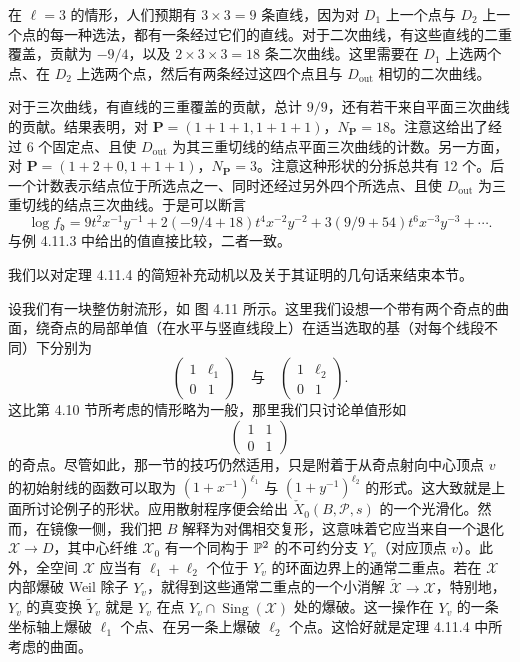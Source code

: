 在 $\ell=3$ 的情形，人们预期有 $3\times3=9$ 条直线，因为对 $D_1$ 上一个点与 $D_2$ 上一个点的每一种选法，都有一条经过它们的直线。对于二次曲线，有这些直线的二重覆盖，贡献为 $-9/4$，以及 $2\times3\times3=18$ 条二次曲线。这里需要在 $D_1$ 上选两个点、在 $D_2$ 上选两个点，然后有两条经过这四个点且与 $D_{\mathrm{out}}$ 相切的二次曲线。

对于三次曲线，有直线的三重覆盖的贡献，总计 $9/9$，还有若干来自平面三次曲线的贡献。结果表明，对 $\mathbf{P}=(1+1+1,1+1+1)$，$N_{\mathbf{P}}=18$。注意这给出了经过 6 个固定点、且使 $D_{\mathrm{out}}$ 为其三重切线的结点平面三次曲线的计数。另一方面，对 $\mathbf{P}=(1+2+0,1+1+1)$，$N_{\mathbf{P}}=3$。注意这种形状的分拆总共有 12 个。后一个计数表示结点位于所选点之一、同时还经过另外四个所选点、且使 $D_{\mathrm{out}}$ 为三重切线的结点三次曲线。于是可以断言
\[
\log f_\mathfrak{d}=9t^{2}x^{-1}y^{-1}+2(-9/4+18)t^{4}x^{-2}y^{-2}+3(9/9+54)t^{6}x^{-3}y^{-3}+\cdots.
\]
与例 4.11.3 中给出的值直接比较，二者一致。

我们以对定理 4.11.4 的简短补充动机以及关于其证明的几句话来结束本节。

设我们有一块整仿射流形，如 图 4.11 所示。这里我们设想一个带有两个奇点的曲面，绕奇点的局部单值（在水平与竖直线段上）在适当选取的基（对每个线段不同）下分别为
\[
\begin{pmatrix}1&\ell_1\\0&1\end{pmatrix}
\quad\text{与}\quad
\begin{pmatrix}1&\ell_2\\0&1\end{pmatrix}.
\]
这比第 4.10 节所考虑的情形略为一般，那里我们只讨论单值形如
\[
\begin{pmatrix}1&1\\0&1\end{pmatrix}
\]
的奇点。尽管如此，那一节的技巧仍然适用，只是附着于从奇点射向中心顶点 $v$ 的初始射线的函数可以取为 $(1+x^{-1})^{\ell_1}$ 与 $(1+y^{-1})^{\ell_2}$ 的形式。这大致就是上面所讨论例子的形状。应用散射程序便会给出 $\check X_0(B,\mathscr{P},s)$ 的一个光滑化。然而，在镜像一侧，我们把 $B$ 解释为对偶相交复形，这意味着它应当来自一个退化 $\mathcal{X}\to D$，其中心纤维 $\mathcal{X}_0$ 有一个同构于 $\mathbb{P}^2$ 的不可约分支 $Y_v$（对应顶点 $v$）。此外，全空间 $\mathcal{X}$ 应当有 $\ell_1+\ell_2$ 个位于 $Y_v$ 的环面边界上的通常二重点。若在 $\mathcal{X}$ 内部爆破 Weil 除子 $Y_v$，就得到这些通常二重点的一个小消解 $\tilde{\mathcal{X}}\to\mathcal{X}$，特别地，$Y_v$ 的真变换 $\tilde Y_v$ 就是 $Y_v$ 在点 $Y_v\cap\operatorname{Sing}(\mathcal{X})$ 处的爆破。这一操作在 $Y_v$ 的一条坐标轴上爆破 $\ell_1$ 个点、在另一条上爆破 $\ell_2$ 个点。这恰好就是定理 4.11.4 中所考虑的曲面。

